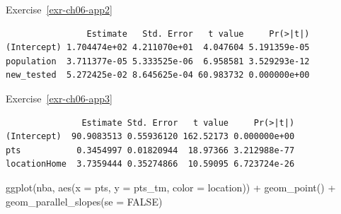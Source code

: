 \documentclass[
  letterpaper,
  DIV=11,
  numbers=noendperiod]{scrreprt}
\newenvironment{Shaded}{\begin{snugshade}}{\end{snugshade}}
\newcommand{\AttributeTok}[1]{\textcolor[rgb]{0.40,0.45,0.13}{#1}}
\newcommand{\ConstantTok}[1]{\textcolor[rgb]{0.56,0.35,0.01}{#1}}
\newcommand{\FunctionTok}[1]{\textcolor[rgb]{0.28,0.35,0.67}{#1}}
\newcommand{\NormalTok}[1]{\textcolor[rgb]{0.00,0.23,0.31}{#1}}
\newcommand{\OtherTok}[1]{\textcolor[rgb]{0.00,0.23,0.31}{#1}}
\newcommand{\SpecialCharTok}[1]{\textcolor[rgb]{0.37,0.37,0.37}{#1}}
\theoremstyle{definition}
\theoremstyle{remark}
\begin{document}
Exercise~\ref{exr-ch06-app2}

\begin{Shaded}
\end{Shaded}

\begin{verbatim}
                Estimate   Std. Error   t value     Pr(>|t|)
(Intercept) 1.704474e+02 4.211070e+01  4.047604 5.191359e-05
population  3.711377e-05 5.333525e-06  6.958581 3.529293e-12
new_tested  5.272425e-02 8.645625e-04 60.983732 0.000000e+00
\end{verbatim}

Exercise~\ref{exr-ch06-app3}

\begin{Shaded}
\end{Shaded}

\begin{verbatim}
               Estimate Std. Error   t value     Pr(>|t|)
(Intercept)  90.9083513 0.55936120 162.52173 0.000000e+00
pts           0.3454997 0.01820944  18.97366 3.212988e-77
locationHome  3.7359444 0.35274866  10.59095 6.723724e-26
\end{verbatim}

\begin{Shaded}
\begin{Highlighting}[]
\FunctionTok{ggplot}\NormalTok{(nba, }\FunctionTok{aes}\NormalTok{(}\AttributeTok{x =}\NormalTok{ pts, }\AttributeTok{y =}\NormalTok{ pts\_tm, }\AttributeTok{color =}\NormalTok{ location)) }\SpecialCharTok{+}
  \FunctionTok{geom\_point}\NormalTok{() }\SpecialCharTok{+}
  \FunctionTok{geom\_parallel\_slopes}\NormalTok{(}\AttributeTok{se =} \ConstantTok{FALSE}\NormalTok{)}
\end{Highlighting}
\end{Shaded}
\end{document}
